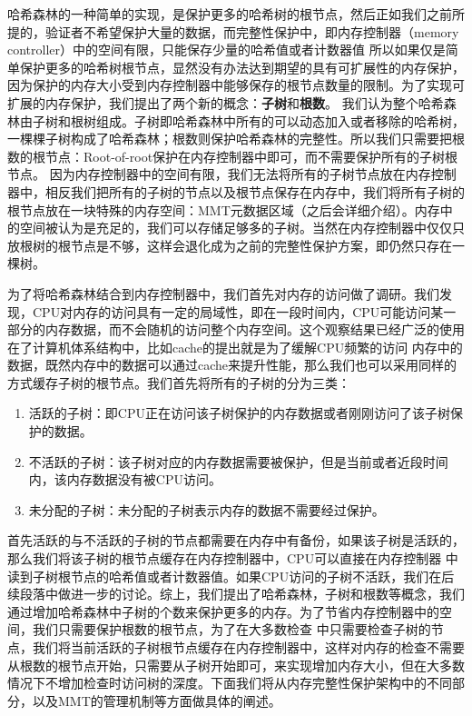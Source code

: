 哈希森林的一种简单的实现，是保护更多的哈希树的根节点，然后正如我们之前所提的，验证者不希望保护大量的数据，而完整性保护中，即内存控制器（memory controller）中的空间有限，只能保存少量的哈希值或者计数器值
所以如果仅是简单保护更多的哈希树根节点，显然没有办法达到期望的具有可扩展性的内存保护，因为保护的内存大小受到内存控制器中能够保存的根节点数量的限制。为了实现可扩展的内存保护，我们提出了两个新的概念：\textbf{子树}和\textbf{根数}。
我们认为整个哈希森林由子树和根树组成。子树即哈希森林中所有的可以动态加入或者移除的哈希树，一棵棵子树构成了哈希森林；根数则保护哈希森林的完整性。所以我们只需要把根数的根节点：Root-of-root保护在内存控制器中即可，而不需要保护所有的子树根节点。
因为内存控制器中的空间有限，我们无法将所有的子树节点放在内存控制器中，相反我们把所有的子树的节点以及根节点保存在内存中，我们将所有子树的根节点放在一块特殊的内存空间：MMT元数据区域（之后会详细介绍）。内存中的空间被认为是充足的，我们可以存储足够多的子树。当然在内存控制器中仅仅只放根树的根节点是不够，这样会退化成为之前的完整性保护方案，即仍然只存在一棵树。

为了将哈希森林结合到内存控制器中，我们首先对内存的访问做了调研。我们发现，CPU对内存的访问具有一定的局域性，即在一段时间内，CPU可能访问某一部分的内存数据，而不会随机的访问整个内存空间。这个观察结果已经广泛的使用在了计算机体系结构中，比如cache的提出就是为了缓解CPU频繁的访问
内存中的数据，既然内存中的数据可以通过cache来提升性能，那么我们也可以采用同样的方式缓存子树的根节点。我们首先将所有的子树的分为三类：
\begin{enumerate}
  \item 活跃的子树：即CPU正在访问该子树保护的内存数据或者刚刚访问了该子树保护的数据。
  \item 不活跃的子树：该子树对应的内存数据需要被保护，但是当前或者近段时间内，该内存数据没有被CPU访问。
  \item 未分配的子树：未分配的子树表示内存的数据不需要经过保护。
\end{enumerate}
首先活跃的与不活跃的子树的节点都需要在内存中有备份，如果该子树是活跃的，那么我们将该子树的根节点缓存在内存控制器中，CPU可以直接在内存控制器
中读到子树根节点的哈希值或者计数器值。如果CPU访问的子树不活跃，我们在后续段落中做进一步的讨论。综上，我们提出了哈希森林，子树和根数等概念，我们通过增加哈希森林中子树的个数来保护更多的内存。为了节省内存控制器中的空间，我们只需要保护根数的根节点，为了在大多数检查
中只需要检查子树的节点，我们将当前活跃的子树根节点缓存在内存控制器中，这样对内存的检查不需要从根数的根节点开始，只需要从子树开始即可，来实现增加内存大小，但在大多数情况下不增加检查时访问树的深度。下面我们将从内存完整性保护架构中的不同部分，以及MMT的管理机制等方面做具体的阐述。

